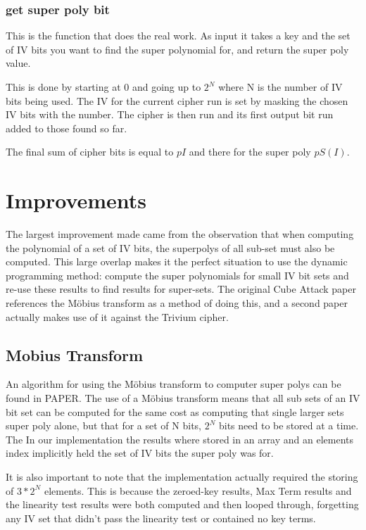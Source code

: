 \documentclass{report}
\let\Oldsection\section
\renewcommand{\section}{\FloatBarrier\Oldsection}
\let\Oldsubsection\subsection
\renewcommand{\subsection}{\FloatBarrier\Oldsubsection}
\let\Oldsubsubsection\subsubsection
\renewcommand{\subsubsection}{\FloatBarrier\Oldsubsubsection}
\begin{document}
\subsubsection{get super poly bit}
This is the function that does the real work. As input it takes a key and the set of IV bits you want to find the super polynomial for, and return the super poly value.

This is done by starting at 0 and going up to $2^N$ where N is the number of IV bits being used. The IV for the current cipher run is set by masking the chosen IV bits with the number. The cipher is then run and its first output bit run added to those found so far.

The final sum of cipher bits is equal to $pI$ and there for the super poly $pS(I)$.
\section{Improvements}
The largest improvement made came from the observation that when computing the polynomial of a set of IV bits, the superpolys of all sub-set must also be computed. This large overlap makes it the perfect situation to use the dynamic programming method: compute the super polynomials for small IV bit sets and re-use these results to find results for super-sets. The original Cube Attack paper references the Möbius transform as a method of doing this, and a second paper %
actually makes use of it against the Trivium cipher. %
\subsection{Mobius Transform}
An algorithm for using the Möbius transform to computer super polys can be found in PAPER.
The use of a Möbius transform means that all sub sets of an IV bit set can be computed for the same cost as computing that single larger sets super poly alone, but that for a set of N bits, $2^N$ bits need to be stored at a time. The In our implementation the results where stored in an array and an elements index implicitly held the set of IV bits the super poly was for.%

It is also important to note that the implementation actually required the storing of $3*2^N$ elements. This is because the zeroed-key results, Max Term results and the linearity test results were both computed and then looped through, forgetting any IV set that didn't pass the linearity test or contained no key terms.
\end{document}
